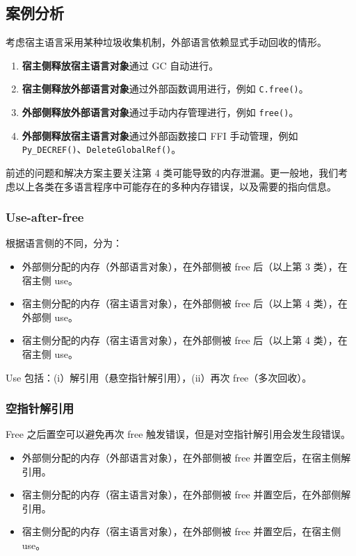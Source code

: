 \subsection{案例分析}
\label{sec:cases}

考虑宿主语言采用某种垃圾收集机制，外部语言依赖显式手动回收的情形。

\begin{enumerate}
\item \textbf{宿主侧释放宿主语言对象}通过 GC 自动进行。
\item \textbf{宿主侧释放外部语言对象}通过外部函数调用进行，例如 \texttt{C.free()}。
\item \textbf{外部侧释放外部语言对象}通过手动内存管理进行，例如 \texttt{free()}。
\item \textbf{外部侧释放宿主语言对象}通过外部函数接口 FFI 手动管理，例如 \texttt{Py\_DECREF()}、\texttt{DeleteGlobalRef()}。
\end{enumerate}

前述的问题和解决方案主要关注第 4 类可能导致的内存泄漏。更一般地，我们考虑以上各类在多语言程序中可能存在的多种内存错误，以及需要的指向信息。

\subsubsection{Use-after-free}

根据语言侧的不同，分为：

\begin{itemize}
\item 外部侧分配的内存（外部语言对象），在外部侧被 free 后（以上第 3 类），在宿主侧 use。
\item 宿主侧分配的内存（宿主语言对象），在外部侧被 free 后（以上第 4 类），在外部侧 use。
\item 宿主侧分配的内存（宿主语言对象），在外部侧被 free 后（以上第 4 类），在宿主侧 use。
\end{itemize}

Use 包括：(i）解引用（悬空指针解引用），(ii）再次 free（多次回收）。

\subsubsection{空指针解引用}

Free 之后置空可以避免再次 free 触发错误，但是对空指针解引用会发生段错误。

\begin{itemize}
\item 外部侧分配的内存（外部语言对象），在外部侧被 free 并置空后，在宿主侧解引用。
\item 宿主侧分配的内存（宿主语言对象），在外部侧被 free 并置空后，在外部侧解引用。
\item 宿主侧分配的内存（宿主语言对象），在外部侧被 free 并置空后，在宿主侧 use。
\end{itemize}

